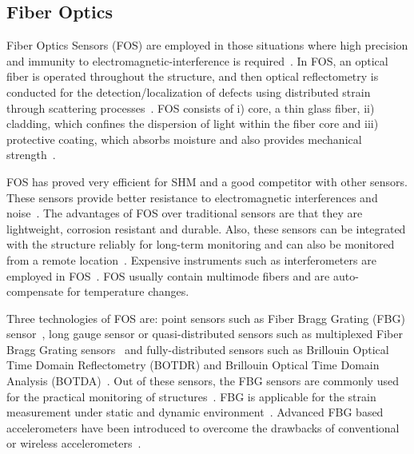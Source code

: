 \documentclass[b5paper, 11pt, titlepage]{book}
\begin{document}
\subsection{Fiber Optics}
Fiber Optics Sensors (FOS) are employed in those situations where high precision and immunity to electromagnetic-interference is required~\cite{li2018fiber}. In FOS, an optical fiber is operated throughout the structure, and then optical reflectometry is conducted for the detection/localization of defects using distributed strain through scattering processes~\cite{warsi2019sensors}. 
FOS consists of i) core, a thin glass fiber, ii) cladding, which confines the dispersion of light within the fiber core and iii) protective coating, which absorbs moisture and also provides mechanical strength~\cite{Torres2011}.

FOS has proved very efficient for SHM and a good competitor with other sensors. These sensors provide better resistance to electromagnetic interferences and noise~\cite{Das2018}. The advantages of FOS over traditional sensors are that they are lightweight, corrosion resistant and durable. Also, these sensors can be integrated with the structure reliably for long-term monitoring and can also be monitored from a remote location~\cite{casas2003fiber, Majumder2008}. Expensive instruments such as interferometers are employed in FOS~\cite{warsi2019sensors}. FOS usually contain multimode fibers and are auto-compensate for temperature changes. 

Three technologies of FOS are: point sensors such as Fiber Bragg Grating (FBG) sensor~\cite{Li2004}, long gauge sensor or quasi-distributed sensors such as multiplexed Fiber Bragg Grating sensors~\cite{Delepine-Lesoille2006} and fully-distributed sensors such as Brillouin Optical Time Domain Reflectometry (BOTDR) and Brillouin Optical Time Domain Analysis
(BOTDA)~\cite{bourne2009energy}. Out of these sensors, the FBG sensors are commonly used for the practical monitoring of structures~\cite{Majumder2008}. FBG is applicable for the strain measurement under static and dynamic environment~\cite{jawaid2018structural}. Advanced FBG based accelerometers have been introduced to overcome the drawbacks of conventional or wireless accelerometers~\cite{Majumder2008}.
\end{document}
